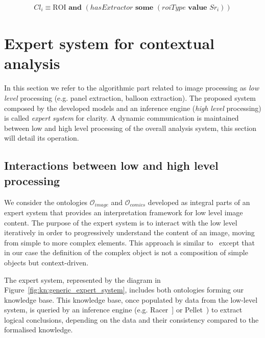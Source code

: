 \begin{equation}
\label{eq:kn:class_region_equivalence}
\begin{split}
Cl_i  \equiv \text{ROI} \textbf{ and } (hasExtractor \textbf{ some } (roiType \textbf{ value } Sr_i ))
\end{split}
\end{equation}



\section{Expert system for contextual analysis} %
\label{sec:kn:expert_system}

In this section we refer to the algorithmic part related to image processing as \emph{low level} processing (e.g. panel extraction, balloon extraction). 
The proposed system composed by the developed models and an inference engine (\emph{high level} processing) is called \emph{expert system} for clarity.
A dynamic communication is maintained between low and high level processing of the overall analysis system, this section will detail its operation.


\subsection{Interactions between low and high level processing} %
\label{sub:interactions_between_low_and_high_level_processing}


We consider the ontologies $\mathcal{O}_{image}$ and $\mathcal{O}_{comics}$ developed as integral parts of an expert system that provides an interpretation framework for low level image content.
The purpose of the expert system is to interact with the low level iteratively in order to progressively understand the content of an image, moving from simple to more complex elements.
This approach is similar to~\cite{Sciascio2011Structured} except that in our case the definition of the complex object is not a composition of simple objects but context-driven.

The expert system, represented by the diagram in Figure~\ref{fig:kn:generic_expert_system}, includes both ontologies forming our knowledge base.
This knowledge base, once populated by data from the low-level system, is queried by an inference engine (e.g. Racer~\cite{Haarslev2012}] or Pellet~\cite{Sirin2007a}) to extract logical conclusions, depending on the data and their consistency compared to the formalised knowledge.


